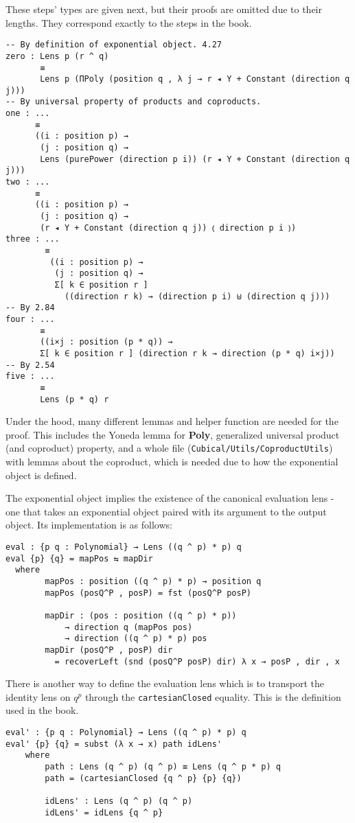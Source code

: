 These steps' types are given next, but their proofs are omitted due to their lengths. They correspond exactly to the steps in the book.
\begin{verbatim}
-- By definition of exponential object. 4.27
zero : Lens p (r ^ q)
       ≡ 
       Lens p (ΠPoly (position q , λ j → r ◂ Y + Constant (direction q j)))
-- By universal property of products and coproducts.  
one : ...
      ≡ 
      ((i : position p) →
       (j : position q) → 
       Lens (purePower (direction p i)) (r ◂ Y + Constant (direction q j)))
two : ...
      ≡ 
      ((i : position p) →
       (j : position q) → 
       (r ◂ Y + Constant (direction q j)) ⦅ direction p i ⦆)
three : ...
        ≡
         ((i : position p) →
          (j : position q) → 
          Σ[ k ∈ position r ] 
            ((direction r k) → (direction p i) ⊎ (direction q j)))
-- By 2.84
four : ... 
       ≡
       ((i×j : position (p * q)) → 
       Σ[ k ∈ position r ] (direction r k → direction (p * q) i×j))
-- By 2.54
five : ...
       ≡
       Lens (p * q) r
\end{verbatim}

Under the hood, many different lemmas and helper function are needed for the proof. This includes the Yoneda lemma for \textbf{Poly}, generalized universal product (and coproduct) property, and a whole file (\texttt{Cubical/Utils/CoproductUtils}) with lemmas about the coproduct, which is needed due to how the exponential object is defined. 

The exponential object implies the existence of the canonical evaluation lens - one that takes an exponential object paired with its argument to the output object. Its implementation is as follows:

\begin{verbatim}
eval : {p q : Polynomial} → Lens ((q ^ p) * p) q
eval {p} {q} = mapPos ⇆ mapDir
  where
        mapPos : position ((q ^ p) * p) → position q
        mapPos (posQ^P , posP) = fst (posQ^P posP)

        mapDir : (pos : position ((q ^ p) * p))
            → direction q (mapPos pos) 
            → direction ((q ^ p) * p) pos
        mapDir (posQ^P , posP) dir
          = recoverLeft (snd (posQ^P posP) dir) λ x → posP , dir , x
\end{verbatim}

There is another way to define the evaluation lens which is to transport the identity lens on $q^p$ through the \texttt{cartesianClosed} equality. 
This is the definition used in the book.
\begin{verbatim}
eval' : {p q : Polynomial} → Lens ((q ^ p) * p) q
eval' {p} {q} = subst (λ x → x) path idLens'
    where
        path : Lens (q ^ p) (q ^ p) ≡ Lens (q ^ p * p) q
        path = (cartesianClosed {q ^ p} {p} {q})

        idLens' : Lens (q ^ p) (q ^ p)
        idLens' = idLens {q ^ p}
\end{verbatim}

